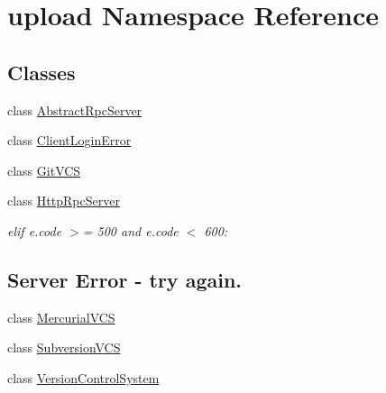 \hypertarget{namespaceupload}{}\section{upload Namespace Reference}
\label{namespaceupload}
\subsection*{Classes}
\begin{DoxyCompactItemize}
\item 
class \hyperlink{classupload_1_1AbstractRpcServer}{Abstract\+Rpc\+Server}
\item 
class \hyperlink{classupload_1_1ClientLoginError}{Client\+Login\+Error}
\item 
class \hyperlink{classupload_1_1GitVCS}{Git\+V\+CS}
\item 
class \hyperlink{classupload_1_1HttpRpcServer}{Http\+Rpc\+Server}
\begin{DoxyCompactList}\small\item\em elif e.\+code $>$= 500 and e.\+code $<$ 600\+: \subsection*{Server Error -\/ try again.}\end{DoxyCompactList}\item 
class \hyperlink{classupload_1_1MercurialVCS}{Mercurial\+V\+CS}
\item 
class \hyperlink{classupload_1_1SubversionVCS}{Subversion\+V\+CS}
\item 
class \hyperlink{classupload_1_1VersionControlSystem}{Version\+Control\+System}
\end{DoxyCompactItemize}
